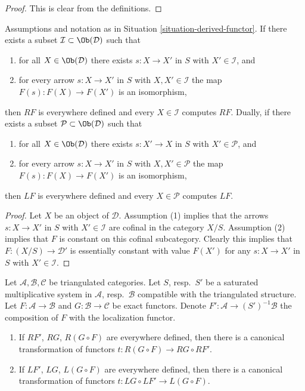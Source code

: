 \begin{proof}
This is clear from the definitions.
\end{proof}

\begin{lemma}
\label{lemma-find-existence-computes}
Assumptions and notation as in
Situation \ref{situation-derived-functor}.
If there exists a subset $\mathcal{I} \subset \Ob(\mathcal{D})$
such that
\begin{enumerate}
\item for all $X \in \Ob(\mathcal{D})$
there exists $s : X \to X'$ in $S$ with $X' \in \mathcal{I}$,
and
\item for every arrow $s : X \to X'$ in $S$ with $X, X' \in \mathcal{I}$
the map $F(s) : F(X) \to F(X')$ is an isomorphism,
\end{enumerate}
then $RF$ is everywhere defined and every $X \in \mathcal{I}$
computes $RF$. Dually, if there exists a subset
$\mathcal{P} \subset \Ob(\mathcal{D})$
such that
\begin{enumerate}
\item for all $X \in \Ob(\mathcal{D})$
there exists $s : X' \to X$ in $S$ with $X' \in \mathcal{P}$,
and
\item for every arrow $s : X \to X'$ in $S$ with $X, X' \in \mathcal{P}$
the map $F(s) : F(X) \to F(X')$ is an isomorphism,
\end{enumerate}
then $LF$ is everywhere defined and every $X \in \mathcal{P}$
computes $LF$.
\end{lemma}

\begin{proof}
Let $X$ be an object of $\mathcal{D}$.
Assumption (1) implies that the arrows $s : X \to X'$ in $S$ with
$X' \in \mathcal{I}$ are cofinal in the category $X/S$. Assumption
(2) implies that $F$ is constant on this cofinal subcategory.
Clearly this implies that $F : (X/S) \to \mathcal{D}'$ is essentially
constant with value $F(X')$ for any $s : X \to X'$ in $S$
with $X' \in \mathcal{I}$.
\end{proof}

\begin{lemma}
\label{lemma-compose-derived-functors-general}
Let $\mathcal{A}, \mathcal{B}, \mathcal{C}$ be triangulated categories.
Let $S$, resp.\ $S'$ be a saturated multiplicative system in
$\mathcal{A}$, resp.\ $\mathcal{B}$ compatible with the triangulated structure.
Let $F : \mathcal{A} \to \mathcal{B}$ and $G : \mathcal{B} \to \mathcal{C}$
be exact functors. Denote $F' : \mathcal{A} \to (S')^{-1}\mathcal{B}$ the
composition of $F$ with the localization functor.
\begin{enumerate}
\item If $RF'$, $RG$, $R(G \circ F)$ are everywhere defined, then there
is a canonical transformation of functors
$t : R(G \circ F) \longrightarrow RG \circ RF'$.
\item If $LF'$, $LG$, $L(G \circ F)$ are everywhere defined, then there
is a canonical transformation of functors
$t : LG \circ LF' \to L(G \circ F)$.
\end{enumerate}
\end{lemma}

